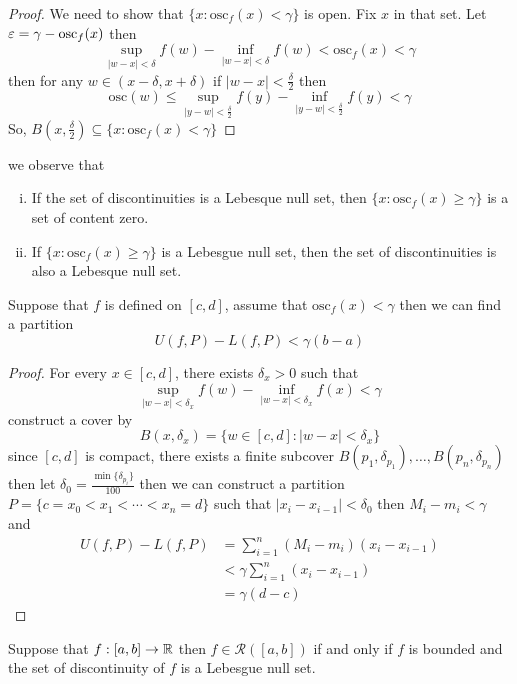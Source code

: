\begin{proof}
  We need to show that $\{x : \mathrm{osc}_f(x) < \gamma\}$ is open. Fix $x$ in that set.
  Let $\varepsilon = {\gamma - \mathrm{osc}_f(x)}$ then 
  \[\sup_{|w-x|< \delta} f(w) - \inf_{|w-x| < \delta} f(w) < \mathrm{osc}_f(x) <\gamma \]
  then for any $w \in (x - \delta, x + \delta)$ if $|w - x| < \frac\delta2$ then
  \[\mathrm{osc}(w) \leq \sup_{|y - w|<\frac\delta2} f(y) - \inf_{|y-w| < \frac\delta2} f(y) < \gamma\]
  So, $B\left(x, \frac\delta2\right) \subseteq \{x : \mathrm{osc}_f(x) < \gamma\}$
\end{proof}
we observe that 
  \begin{enumerate}[(i)]
    \item If the set of discontinuities is a Lebesque null set, then 
    $\{x : \mathrm{osc}_f(x) \ge \gamma\}$ is a set of content zero. 
    \item If $\{x : \mathrm{osc}_f(x) \ge \gamma\}$ is a Lebesgue null set, then
    the set of discontinuities is also a Lebesque null set.
  \end{enumerate}

\begin{lemma}\label{lem:bounded-int-by-osc}
  Suppose that $f$ is defined on $[c, d]$, assume that $\mathrm{osc}_f(x) < \gamma$
  then we can find a partition 
  \[U(f, P) - L(f, P) < \gamma(b-a)\]
\end{lemma}
\begin{proof}
  For every $x \in [c, d]$, there exists $\delta_x > 0$ such that
  \[\sup_{|w-x| < \delta_x} f(w) - \inf_{|w-x| < \delta_x} f(x) < \gamma\]
  construct a cover by \[B(x, \delta_x) = \{w\in[c,d] : |w-x| < \delta_x\}\]
  since $[c, d]$ is compact, there exists a finite subcover $B(p_1, \delta_{p_1}), \dotsc, B(p_n, \delta_{p_n})$
  then let $\delta_0 = \frac{\min\{\delta_{p_i}\}}{100}$ 
  then we can construct a partition $P = \{c = x_0 < x_1 < \cdots < x_n = d\}$ such that $|x_i - x_{i-1}| < \delta_0$
  then $M_i - m_i < \gamma$ and 
  \begin{align*}
    U(f, P) - L(f, P) &= \sum_{i=1}^{n}(M_i - m_i)(x_i - x_{i-1})\\
    &< \gamma\sum_{i=1}^{n}(x_i - x_{i-1})\\
    &= \gamma(d-c)
  \end{align*}
\end{proof}

\begin{theorem}
  Suppose that $f: [a, b] \to \mathbb R$ then
  $f \in \mathcal{R}([a, b])$ if and only if $f$ is bounded and the set of discontinuity of $f$ is a Lebesgue null set.
\end{theorem}

